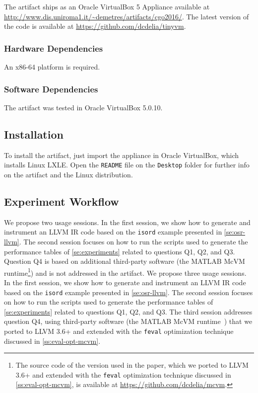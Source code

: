 The artifact ships as an Oracle VirtualBox 5 Appliance available at {\small \url{http://www.dis.uniroma1.it/~demetres/artifacts/cgo2016/}}.
The latest version of the code is available at {\small \url{https://github.com/dcdelia/tinyvm}}.

\subsubsection{Hardware Dependencies}

An x86-64 platform is required.

\subsubsection{Software Dependencies}

The artifact was tested in Oracle VirtualBox 5.0.10. 


\subsection{Installation}

To install the artifact, just import the appliance in Oracle VirtualBox, which installs Linux LXLE. Open the {\tt README} file on the {\tt Desktop} folder for further info on the artifact and the Linux distribution.

\subsection{Experiment Workflow}

\ifdefined \nomcvm
We propose two usage sessions. In the first session, we show how to generate and instrument an LLVM IR code based on the \texttt{isord} example presented in \mysection\ref{se:osr-llvm}. The second session focuses on how to run the scripts used to generate the performance tables of \mysection\ref{se:experiments} related to questions Q1, Q2, and Q3. Question Q4 is based on additional third-party software (the MATLAB McVM runtime\footnote{The source code of the version used in the paper, which we ported to LLVM 3.6+ and extended with the {\tt feval} optimization technique discussed in \ref{ss:eval-opt-mcvm}, is available at \url{https://github.com/dcdelia/mcvm}.}) and is not addressed in the artifact.
\else
We propose three usage sessions. In the first session, we show how to generate and instrument an LLVM IR code based on the \texttt{isord} example presented in \mysection\ref{se:osr-llvm}. The second session focuses on how to run the scripts used to generate the performance tables of \mysection\ref{se:experiments} related to questions Q1, Q2, and Q3. The third session addresses question Q4, using third-party software (the MATLAB McVM runtime~\cite{mcvm}) that we ported to LLVM 3.6+ and extended with the {\tt feval} optimization technique discussed in \ref{ss:eval-opt-mcvm}.
\fi

